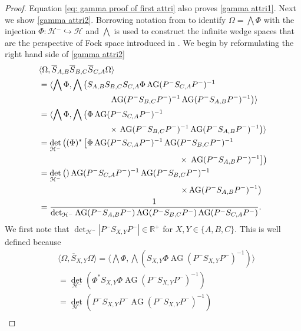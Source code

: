 \documentclass[b5paper,draft,openbib,12pt]{memoir}
\DeclareMathOperator{\AG}{AG}
\begin{document}
\begin{proof}
 Equation 
\eqref{eq: gamma proof of first attri} also proves \eqref{gamma attri1}. Next we show \eqref{gamma attri2}. 
Borrowing notation from \cite[section 2]{ivp0} to identify \(\Omega=\bigwedge \Phi\) with the injection \(\Phi: \mathcal{H}^-\hookrightarrow\mathcal{H}\)
and \(\bigwedge\) is used to construct the infinite wedge spaces that are the perspective of Fock space introduced in \cite{ivp0}. 
We begin by reformulating the right hand side of  \eqref{gamma attri2}
\begin{align}
 &\langle \Omega, \overline{S}_{A,B} \overline{S}_{B,C} \overline{S}_{C,A}\Omega\rangle \\\notag
&=\langle \bigwedge \Phi, \bigwedge \left(S_{A,B}S_{B,C}S_{C,A}\Phi \AG(P^-S_{C,A} P^-)^{-1}\right.\\\notag
&\hspace{3cm}\left. \AG(P^-S_{B,C} P^-)^{-1} \AG(P^-S_{A,B} P^-)^{-1}  \right)\rangle \\
&=\langle \bigwedge \Phi, \bigwedge \left(\Phi \AG(P^-S_{C,A} P^-)^{-1}\right.\\\notag
&\hspace{3cm}\times\left. \AG(P^-S_{B,C} P^-)^{-1} \AG(P^-S_{A,B} P^-)^{-1}  \right)\rangle \\
&=\det_{\mathcal{H}^-}\left( (\Phi)^*  \left[\Phi \AG(P^- S_{C,A} P^-)^{-1} \AG(P^-S_{B,C} P^-)^{-1}\right.\right.\\\notag
&\hspace{6cm}\times\left.\left. \AG(P^-S_{A,B} P^-)^{-1} \right] \right)\\
&=\det_{\mathcal{H}^-}  \left()\AG(P^- S_{C,A} P^-)^{-1} \AG(P^- S_{B,C} P^-)^{-1}\right.\\ \notag
&\hspace{6cm}\left.\times\AG(P^-S_{A,B} P^-)^{-1}\right)  \\\label{eq:1/arg}
&=\frac{1}{\det_{\mathcal{H}^-}  \AG(P^- S_{A,B} P^-) \AG(P^- S_{B,C} P^-) \AG(P^-S_{C,A} P^-) }.
\end{align}
We first note that \(\det_{\mathcal{H}^-}|P^- S_{X,Y}P^-|\in\mathbb{R}^+\) for \(X,Y\in \{A,B,C\}\). This is well defined because 
\begin{align}
&\langle \Omega, \overline{S}_{X,Y}\Omega\rangle
=\langle \bigwedge \Phi, \bigwedge(S_{X,Y}\Phi \AG(P^- S_{X,Y}P^-)^{-1})\rangle\\
&=\det_{\mathcal{H}^-} \left( \Phi^* S_{X,Y}\Phi \AG(P^- S_{X,Y}P^-)^{-1}\right)\\
&=\det_{\mathcal{H}^-} \left( P^- S_{X,Y} P^- \AG(P^- S_{X,Y}P^-)^{-1}\right)\\

\end{align}
\end{proof}
\end{document}
